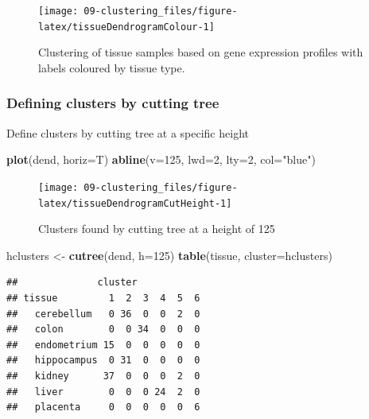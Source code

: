 \documentclass[]{book}
\newenvironment{Shaded}{\begin{snugshade}}{\end{snugshade}}
\newcommand{\KeywordTok}[1]{\textcolor[rgb]{0.13,0.29,0.53}{\textbf{{#1}}}}
\newcommand{\DataTypeTok}[1]{\textcolor[rgb]{0.13,0.29,0.53}{{#1}}}
\newcommand{\DecValTok}[1]{\textcolor[rgb]{0.00,0.00,0.81}{{#1}}}
\newcommand{\StringTok}[1]{\textcolor[rgb]{0.31,0.60,0.02}{{#1}}}
\newcommand{\NormalTok}[1]{{#1}}
\theoremstyle{definition}
\theoremstyle{definition}
\theoremstyle{definition}
\theoremstyle{remark}
\begin{document}
\begin{figure}

{\centering \texttt{[image: 09-clustering\_files/figure-latex/tissueDendrogramColour-1]} 

}

\caption{Clustering of tissue samples based on gene expression profiles with labels coloured by tissue type. }\label{fig:tissueDendrogramColour}
\end{figure}

\subsubsection{Defining clusters by cutting
tree}\label{defining-clusters-by-cutting-tree}

Define clusters by cutting tree at a specific height

\begin{Shaded}
\begin{Highlighting}[]
\KeywordTok{plot}\NormalTok{(dend, }\DataTypeTok{horiz=}\NormalTok{T)}
\KeywordTok{abline}\NormalTok{(}\DataTypeTok{v=}\DecValTok{125}\NormalTok{, }\DataTypeTok{lwd=}\DecValTok{2}\NormalTok{, }\DataTypeTok{lty=}\DecValTok{2}\NormalTok{, }\DataTypeTok{col=}\StringTok{"blue"}\NormalTok{)}
\end{Highlighting}
\end{Shaded}

\begin{figure}

{\centering \texttt{[image: 09-clustering\_files/figure-latex/tissueDendrogramCutHeight-1]} 

}

\caption{Clusters found by cutting tree at a height of 125}\label{fig:tissueDendrogramCutHeight}
\end{figure}

\begin{Shaded}
\begin{Highlighting}[]
\NormalTok{hclusters <-}\StringTok{ }\KeywordTok{cutree}\NormalTok{(dend, }\DataTypeTok{h=}\DecValTok{125}\NormalTok{)}
\KeywordTok{table}\NormalTok{(tissue, }\DataTypeTok{cluster=}\NormalTok{hclusters)}
\end{Highlighting}
\end{Shaded}

\begin{verbatim}
##              cluster
## tissue         1  2  3  4  5  6
##   cerebellum   0 36  0  0  2  0
##   colon        0  0 34  0  0  0
##   endometrium 15  0  0  0  0  0
##   hippocampus  0 31  0  0  0  0
##   kidney      37  0  0  0  2  0
##   liver        0  0  0 24  2  0
##   placenta     0  0  0  0  0  6
\end{verbatim}
\end{document}
